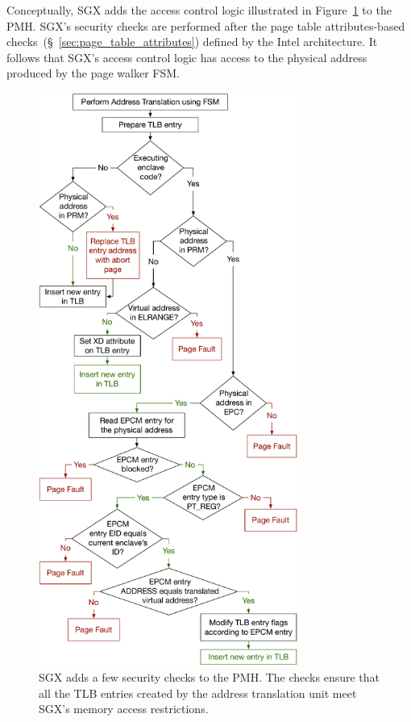 Conceptually, SGX adds the access control logic illustrated in
Figure~\ref{fig:sgx_tlb_miss_checks} to the PMH. SGX's security checks are
performed after the page table attributes-based
checks~(\S~\ref{sec:page_table_attributes}) defined by the Intel architecture.
It follows that SGX's access control logic has access to the physical address
produced by the page walker FSM.

\begin{figure}[hbtp]
  \centering
  \includegraphics[width=85mm]{figures/sgx_tlb_miss_checks.pdf}
  \caption{
    SGX adds a few security checks to the PMH. The checks ensure that all the
    TLB entries created by the address translation unit meet SGX's memory
    access restrictions.
  }
  \label{fig:sgx_tlb_miss_checks}
\end{figure}


